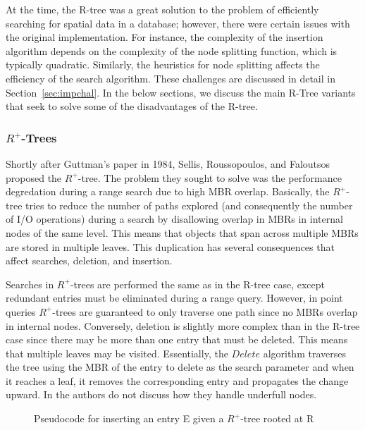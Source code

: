 At the time, the R-tree  was a great solution to the problem of efficiently searching
for spatial data in a database; however, there were certain issues with the original
implementation. For instance, the complexity of the insertion algorithm
depends on the complexity of the node splitting function, which is typically
quadratic. Similarly, the heuristics for node splitting affects the efficiency of 
the search algorithm. These challenges are discussed in detail in 
Section~\ref{sec:impchal}. In the below sections, we discuss the main R-Tree
variants that seek to solve some of the disadvantages of the R-tree.

\subsubsection{$R^{+}$-Trees}
Shortly after Guttman's paper in 1984, Sellis, Roussopoulos, and Faloutsos proposed 
the $R^{+}$-tree. The problem they sought to solve was the performance degredation 
during a range search due to high MBR overlap. Basically, the $R^{+}$-tree tries to 
reduce the number of paths explored (and consequently the number of I/O operations) 
during a search by disallowing overlap in MBRs in internal nodes of the same level. 
This means that objects that span across multiple MBRs are stored in multiple leaves. 
This duplication has several consequences that affect searches, deletion, and insertion.

Searches in $R^{+}$-trees are performed the same as in the R-tree case, except
redundant entries must be eliminated during a range query. However, in point queries
$R^{+}$-trees are guaranteed to only traverse one path since no MBRs overlap in 
internal nodes. Conversely, deletion is slightly more complex than in the R-tree case
since there may be more than one entry that must be deleted. This means that multiple 
leaves may be visited. Essentially, the $Delete$ algorithm traverses the tree using
the MBR of the entry to delete as the search parameter and when it reaches a leaf, it 
removes the corresponding entry and propagates the change upward. In 
\cite{sellisroussopoulosfaloutsos87} the authors do not discuss how they handle underfull nodes.


\begin{figure}[t!]
\begin{algorithmic}
					\State {}
				\EndIf
			\EndFor
		\Else
				\State {}
			\Else
			\EndIf
		\EndIf
	\EndFunction
\end{algorithmic}
\caption{Pseudocode for inserting an entry E given a $R^{+}$-tree rooted at R}
\label{fig:R+_Tree_Insert}
\end{figure}


